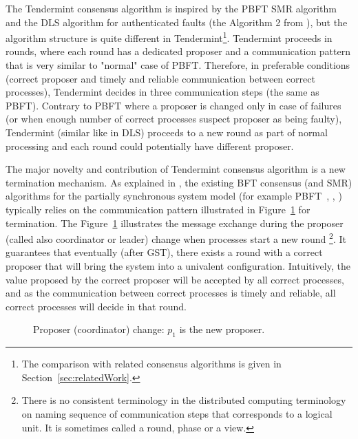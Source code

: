The Tendermint consensus algorithm is inspired by the PBFT SMR algorithm~\cite{CL99:osdi} and the DLS algorithm for authenticated faults (the Algorithm 2 from \cite{DLS88:jacm}), but the algorithm structure is quite different in Tendermint\footnote{The comparison with related consensus algorithms is given in Section~\ref{sec:relatedWork}.}. Tendermint proceeds in rounds, where each round has a dedicated proposer and a communication pattern that is very similar to "normal" case of PBFT. Therefore, in preferable conditions (correct proposer and timely and reliable communication between correct processes), Tendermint decides in three communication steps (the same as PBFT). Contrary to PBFT where a proposer is changed only in case of failures (or when enough number of correct processes suspect proposer as being faulty), Tendermint (similar like in DLS) proceeds to a new round as part of normal processing and each round could potentially have different proposer. 

The major novelty and contribution of Tendermint consensus algorithm is a new termination mechanism. As explained in \cite{MHS09:opodis, RMS10:dsn}, the existing BFT consensus (and SMR) algorithms for the partially synchronous system model (for example PBFT~\cite{CL99:osdi}, \cite{DLS88:jacm}, \cite{MA06:tdsc}) typically relies on the communication pattern illustrated in Figure~\ref{ch3:fig:coordinator-change} for termination. The Figure~\ref{ch3:fig:coordinator-change} illustrates the message exchange during the proposer (called also coordinator or leader) change when processes start a new round \footnote{There is no consistent terminology in the distributed computing terminology on naming sequence of communication steps that corresponds to a logical unit. It is sometimes called a round, phase or a view.}. It guarantees that eventually (after GST), there exists a round with a correct proposer that will bring the system into a univalent configuration. Intuitively, the value proposed by the correct proposer will be accepted by all correct processes, and as the communication between correct processes is timely and reliable, all correct processes will decide in that round.   

\begin{figure}[tbh!]
	\def\rdstretch{5}
	\def\ystretch{3}
	\centering
	\begin{rounddiag}{4}{2}
	\end{rounddiag}
	\vspace{-5mm}
	\caption{\boldmath Proposer (coordinator) change: $p_1$ is the new proposer.}
	\label{ch3:fig:coordinator-change}
\end{figure}  

